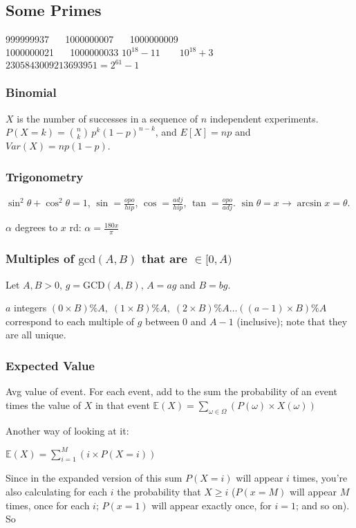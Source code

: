 \documentclass[12pt, a4paper, twoside]{article}
\begin{document}
\

\subsection{Some Primes}

999999937 $\quad$ 1000000007 $\quad$ 1000000009 \\
1000000021 $\quad$ 1000000033 $10^{18} - 11 \quad\quad 10^{18} + 3$ \\
$2305843009213693951 = 2^{61} - 1$

\subsubsection{Binomial}
$X$ is the number of successes in a sequence of $n$ independent experiments.  $P(X = k) = \binom{n}{k}\,p^{k}(1-p)^{n-k}$, and $E[X] = np$ and $Var(X) = np(1-p)$.


\subsubsection{Trigonometry}
$\sin^2\theta + \cos^2\theta = 1$, $\sin = \frac{opo}{hip}$, $\cos = \frac{adj}{hip}$, $\tan = \frac{opo}{adj}$. $\sin \theta = x \to \arcsin x = \theta$.

$\alpha$ degrees to $x$ rd: $\alpha = \frac{180x}{\pi}$

\subsubsection{Multiples of $\textrm{gcd}(A, B)$ that are $\in [0, A)$}
Let $A, B > 0$, $g = \textrm{GCD}(A, B)$, $A = ag$ and $B = bg$.

$a$ integers
$(0\times B) \% A,\; (1\times B) \% A,\; (2\times B) \% A \dotsc ((a-1)\times B) \% A$
correspond to each multiple of $g$ between $0$ and $A-1$ (inclusive); note that they
are all unique.

\subsubsection{Expected Value}
Avg value of event. For each event, add to the sum the probability of an event times the value of $X$ in that event
$\mathbb{E}(X) = \sum_{\omega \in \Omega} (P(\omega)\times X(\omega))$

Another way of looking at it:

$\mathbb{E}(X) = \sum_{i=1}^{M} (i \times P(X=i))$

Since in the expanded version of this sum $P(X=i)$ will appear $i$ times, you're also calculating for each $i$ the probability that $X \geq i$ ($P(x=M)$ will appear $M$ times, once for each $i$; $P(x=1)$ will appear exactly once, for $i=1$; and so on). So
\end{document}
